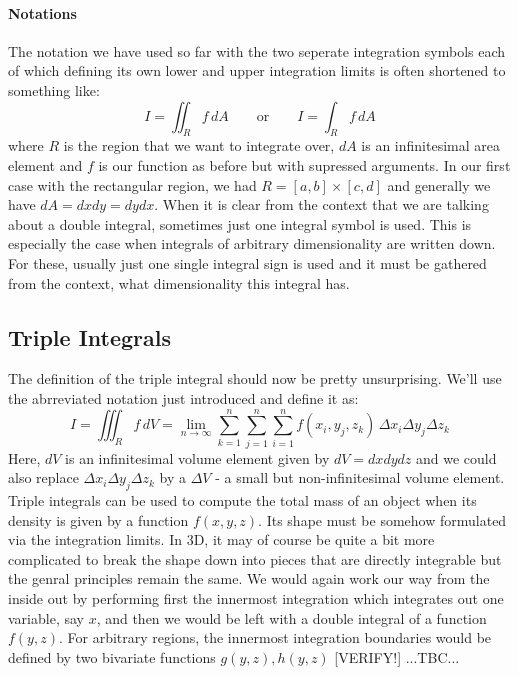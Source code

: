 \paragraph{Notations}
The notation we have used so far with the two seperate integration symbols each of which defining its own lower and upper integration limits is often shortened to something like:
\begin{equation}
I = \iint_R f \, dA  \qquad \text{or}  \qquad 
I = \int_R  f \, dA
\end{equation}
where $R$ is the region that we want to integrate over, $d A$ is an infinitesimal area element and $f$ is our function as before but with supressed arguments. In our first case with the rectangular region, we had $R = [a,b] \times [c,d]$ and generally we have $dA = dx dy = dy dx$. When it is clear from the context that we are talking about a double integral, sometimes just one integral symbol is used. This is especially the case when integrals of arbitrary dimensionality are written down. For these, usually just one single integral sign is used and it must be gathered from the context, what dimensionality this integral has.

\subsection{Triple Integrals}
The definition of the triple integral should now be pretty unsurprising. We'll use the abrreviated notation just introduced and define it as:
\begin{equation}
I = \iiint_R f \, dV = \lim_{n \rightarrow \infty} \sum_{k=1}^n \sum_{j=1}^n \sum_{i=1}^n f(x_i, y_j, z_k) \, \Delta x_i \Delta y_j \Delta z_k
\end{equation}
Here, $dV$ is an infinitesimal volume element given by $dV = dx dy dz$ and we could also replace $\Delta x_i \Delta y_j \Delta z_k$ by a $\Delta V$ - a small but non-infinitesimal volume element. Triple integrals can be used to compute the total mass of an object when its density is given by a function $f(x,y,z)$. Its shape must be somehow formulated via the integration limits. In 3D, it may of course be quite a bit more complicated to break the shape down into pieces that are directly integrable but the genral principles remain the same. We would again work our way from the inside out by performing first the innermost integration which integrates out one variable, say $x$, and then we would be left with a double integral of a function $f(y,z)$. For arbitrary regions, the innermost integration boundaries would be defined by two bivariate functions $g(y,z), h(y,z)$ [VERIFY!]
...TBC...

